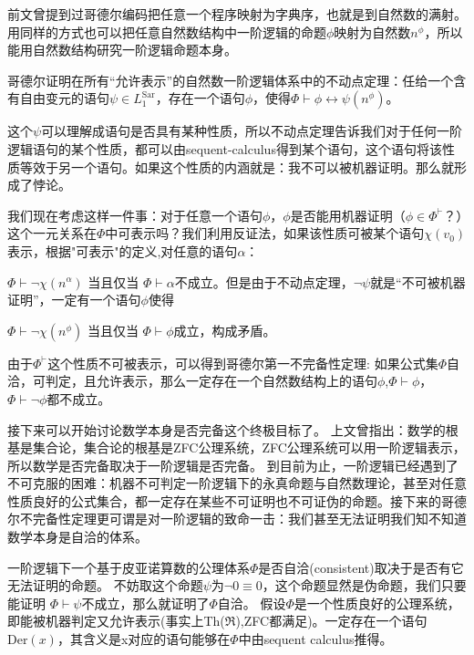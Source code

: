 				 前文曾提到过哥德尔编码把任意一个程序映射为字典序，也就是到自然数的满射。用同样的方式也可以把任意自然数结构中一阶逻辑的命题$\phi$映射为自然数$n^{\phi}$，所以能用自然数结构研究一阶逻辑命题本身。

		     哥德尔证明在所有“允许表示”的自然数一阶逻辑体系中的不动点定理：任给一个含有自由变元的语句$\psi \in L_1^{\text{Sar}}$，存在一个语句$\phi$，使得$\Phi \vdash \phi \leftrightarrow \psi(n^{\phi})$。


				 这个$\psi$可以理解成语句是否具有某种性质，所以不动点定理告诉我们对于任何一阶逻辑语句的某个性质，都可以由sequent-calculus得到某个语句，这个语句将该性质等效于另一个语句。如果这个性质的内涵就是：我不可以被机器证明。那么就形成了悖论。


         我们现在考虑这样一件事：对于任意一个语句$\phi$，$\phi$是否能用机器证明（$\phi \in \Phi^{\vdash}$？）这个一元关系在$\Phi$中可表示吗？我们利用反证法，如果该性质可被某个语句$\chi(v_0)$表示，根据"可表示"的定义,对任意的语句$\alpha$：

				 $\Phi \vdash \lnot \chi(n^\alpha)$ 当且仅当 $\Phi \vdash \alpha$不成立。但是由于不动点定理，$\lnot \psi$就是“不可被机器证明”，一定有一个语句$\phi$使得

         $\Phi \vdash \lnot \chi(n^\phi)$ 当且仅当 $\Phi \vdash \phi$成立，构成矛盾。


     由于$\Phi^{\vdash}$这个性质不可被表示，可以得到哥德尔第一不完备性定理:
     如果公式集$\Phi$自洽，可判定，且允许表示，那么一定存在一个自然数结构上的语句$\phi$,$\Phi \vdash \phi$，$\Phi \vdash \lnot \phi$都不成立。


		 接下来可以开始讨论数学本身是否完备这个终极目标了。
     上文曾指出：数学的根基是集合论，集合论的根基是ZFC公理系统，ZFC公理系统可以用一阶逻辑表示，所以数学是否完备取决于一阶逻辑是否完备。
     到目前为止，一阶逻辑已经遇到了不可克服的困难：机器不可判定一阶逻辑下的永真命题与自然数理论，甚至对任意性质良好的公式集合，都一定存在某些不可证明也不可证伪的命题。接下来的哥德尔不完备性定理更可谓是对一阶逻辑的致命一击：我们甚至无法证明我们知不知道数学本身是自洽的体系。

     一阶逻辑下一个基于皮亚诺算数的公理体系$\Phi$是否自洽(consistent)取决于是否有它无法证明的命题。
		 不妨取这个命题$\psi$为$\lnot 0 \equiv 0$，这个命题显然是伪命题，我们只要能证明
     $\Phi \vdash \psi$不成立，那么就证明了$\Phi$自洽。
		 假设$\Phi$是一个性质良好的公理系统，即能被机器判定又允许表示(事实上Th($\Re$),ZFC都满足)。一定存在一个语句$\text{Der}(x)$，其含义是x对应的语句能够在$\Phi$中由sequent calculus推得。




